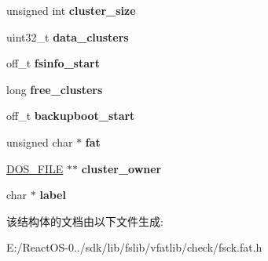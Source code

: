 \begin{DoxyCompactItemize}
unsigned int {\bfseries cluster\+\_\+size}
\item 
\mbox{\label{struct_d_o_s___f_s_a96c230e16b4b70b6806ead36de8aa4b3}} 
uint32\+\_\+t {\bfseries data\+\_\+clusters}
\item 
\mbox{\label{struct_d_o_s___f_s_a2b125499904b16a686f7ef1e85867e05}} 
off\+\_\+t {\bfseries fsinfo\+\_\+start}
\item 
\mbox{\label{struct_d_o_s___f_s_ace2d9c7013dada34deca28a2019a2cfb}} 
long {\bfseries free\+\_\+clusters}
\item 
\mbox{\label{struct_d_o_s___f_s_a263f530588de4f146be536bfe9839b7e}} 
off\+\_\+t {\bfseries backupboot\+\_\+start}
\item 
\mbox{\label{struct_d_o_s___f_s_ab17de03c6b27489899eb0280b993c0d2}} 
unsigned char $\ast$ {\bfseries fat}
\item 
\mbox{\label{struct_d_o_s___f_s_a88fa9920bd6cca4cf7fbf5667d9beaad}} 
\hyperlink{struct__dos__file}{D\+O\+S\+\_\+\+F\+I\+LE} $\ast$$\ast$ {\bfseries cluster\+\_\+owner}
\item 
\mbox{\label{struct_d_o_s___f_s_a281367411962c4adfea09a4e2bd12f57}} 
char $\ast$ {\bfseries label}
\end{DoxyCompactItemize}


该结构体的文档由以下文件生成\+:\begin{DoxyCompactItemize}
\item 
E\+:/\+React\+O\+S-\/0../sdk/lib/fslib/vfatlib/check/fsck.\+fat.\+h\end{DoxyCompactItemize}
